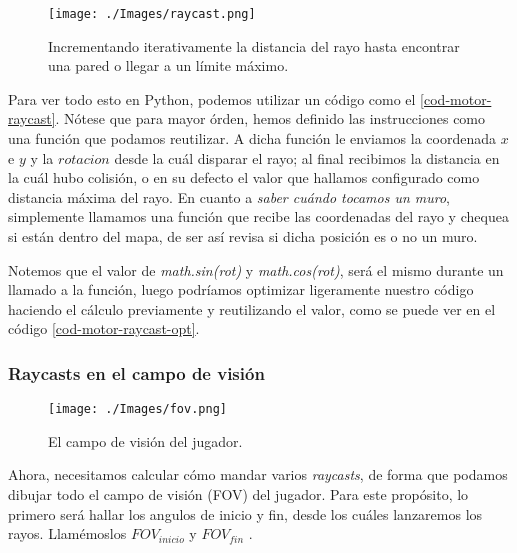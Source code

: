\begin{figure}[h!]
	\centering
	\texttt{[image: ./Images/raycast.png]}
	\caption{Incrementando iterativamente la distancia del rayo hasta encontrar una pared o llegar a un límite máximo.}
	\label{raycastit}
\end{figure}

Para ver todo esto en Python, podemos utilizar un código como el \ref{cod-motor-raycast}. Nótese que para mayor órden, hemos definido las instrucciones como una función que podamos reutilizar. A dicha función le enviamos la coordenada $x$ e $y$ y la $rotacion$ desde la cuál disparar el rayo; al final recibimos la distancia en la cuál hubo colisión, o en su defecto el valor que hallamos configurado como distancia máxima del rayo. En cuanto a \emph{saber cuándo tocamos un muro}, simplemente llamamos una función que recibe las coordenadas del rayo y chequea si están dentro del mapa, de ser así revisa si dicha posición es o no un muro.



Notemos que el valor de \emph{math.sin(rot)} y \emph{math.cos(rot)}, será el mismo durante un llamado a la función, luego podríamos optimizar ligeramente nuestro código haciendo el cálculo previamente y reutilizando el valor, como se puede ver en el código \ref{cod-motor-raycast-opt}.

\newpage




\newpage

\subsubsection{Raycasts en el campo de visión}

\begin{figure}[h!]
	\centering
	\texttt{[image: ./Images/fov.png]}
	\caption{El campo de visión del jugador.}
	\label{fovgraph}
\end{figure}

Ahora, necesitamos calcular cómo mandar varios \emph{raycasts}, de forma que podamos dibujar todo el campo de visión (FOV) del jugador. Para este propósito, lo primero será hallar los angulos de inicio y fin, desde los cuáles lanzaremos los rayos. Llamémoslos $FOV_{inicio}$ y $FOV_{fin}$ .

